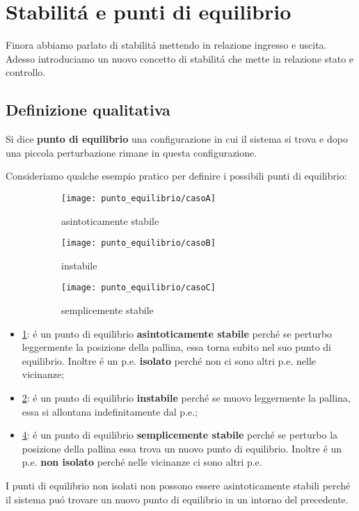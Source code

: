 \documentclass[../main.tex]{subfiles}
\begin{document}
	\newcommand{\pe}[1]{\hat{\underline #1}}
	\section{Stabilit\'a e punti di equilibrio}
		Finora abbiamo parlato di stabilit\'a mettendo in relazione ingresso e uscita. Adesso introduciamo un nuovo concetto di stabilit\'a che mette in relazione stato e controllo.
		
	\subsection{Definizione qualitativa}
		Si dice \textbf{punto di equilibrio} una configurazione in cui il sistema si trova e dopo una piccola perturbazione rimane in questa configurazione.
		
		Consideriamo qualche esempio pratico per definire i possibili punti di equilibrio:
		\begin{figure}[h!]
			\centering
			\begin{subfigure}{0.27\textwidth}
				\texttt{[image: punto\_equilibrio/casoA]}
				\caption{asintoticamente stabile}
				\label{fig:asint_stab}
			\end{subfigure}
			\centering
			\begin{subfigure}{0.27\textwidth}
				\texttt{[image: punto\_equilibrio/casoB]}
				\caption{instabile}
				\label{fig:instabile}
			\end{subfigure}
			\centering
			\begin{subfigure}{0.27\textwidth}
				\texttt{[image: punto\_equilibrio/casoC]}
				\caption{semplicemente stabile}
				\label{fig:sempl_stab}
			\end{subfigure}
			\caption{}
		\end{figure}
	
		\begin{itemize}
			\item
				\ref{fig:asint_stab}: \'e un punto di equilibrio \textbf{asintoticamente stabile} perch\'e se perturbo leggermente la posizione della pallina, essa torna subito nel suo punto di equilibrio. Inoltre \'e un p.e. \textbf{isolato} perch\'e non ci sono altri p.e. nelle vicinanze;
			\item
				\ref{fig:instabile}: \'e un punto di equilibrio \textbf{instabile} perch\'e se muovo leggermente la pallina, essa si allontana indefinitamente dal p.e.;
			\item
				\ref{fig:sempl_stab}: \'e un punto di equilibrio \textbf{semplicemente stabile} perch\'e se perturbo la posizione della pallina essa trova un nuovo punto di equilibrio. Inoltre \'e un p.e. \textbf{non isolato} perch\'e nelle vicinanze ci sono altri p.e.
		\end{itemize}
		I punti di equilibrio non isolati non possono essere asintoticamente stabili perch\'e il sistema pu\'o trovare un nuovo punto di equilibrio in un intorno del precedente.
		
\end{document}
